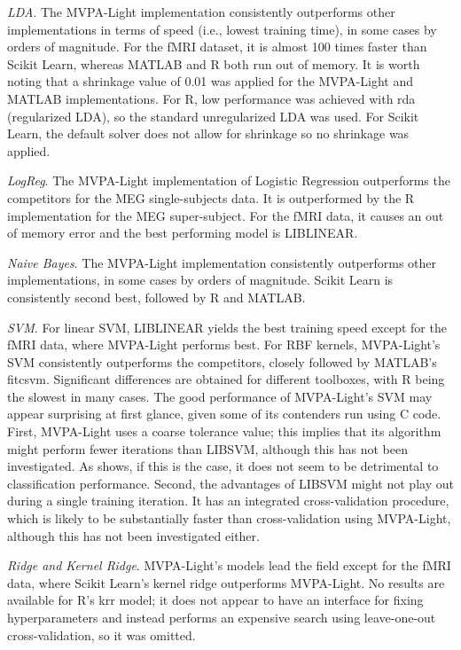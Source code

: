 \documentclass[utf8]{frontiersSCNS} %
\begin{document}
\textit{LDA}. The MVPA-Light implementation consistently outperforms other implementations in terms of speed (i.e., lowest training time), in some cases by orders of magnitude. For the fMRI dataset, it is almost 100 times faster than Scikit Learn, whereas MATLAB and R both run out of memory. It is worth noting that a shrinkage value of 0.01 was applied for the MVPA-Light and MATLAB implementations. For R, low performance was achieved with rda (regularized LDA), so the standard unregularized LDA was used. For Scikit Learn, the default solver does not allow for shrinkage so no shrinkage was applied.

\textit{LogReg}. The MVPA-Light implementation of Logistic Regression outperforms the competitors for the MEG single-subjects data. It is outperformed by the R implementation for the MEG super-subject. For the fMRI data, it causes an out of memory error and the best performing model is LIBLINEAR.

\textit{Naive Bayes}. The MVPA-Light implementation consistently outperforms other implementations, in some cases by orders of magnitude. Scikit Learn is consistently second best, followed by R and MATLAB.

\textit{SVM}. For linear SVM, LIBLINEAR yields the best training speed except for the fMRI data, where MVPA-Light performs best. For RBF kernels, MVPA-Light's SVM consistently outperforms the competitors, closely followed by MATLAB's fitcsvm. Significant differences are obtained for different toolboxes, with R being the slowest in many cases. The good performance of MVPA-Light's SVM may appear surprising at first glance, given some of its contenders run using C code. First, MVPA-Light uses a coarse tolerance value; this implies that its algorithm might perform fewer iterations than LIBSVM, although this has not been investigated. As  shows, if this is the case, it does not seem to be detrimental to classification performance. Second, the advantages of LIBSVM might not play out during a single training iteration. It has an integrated cross-validation procedure, which is likely to be substantially faster than cross-validation using MVPA-Light, although this has not been investigated either.

\textit{Ridge and Kernel Ridge}. MVPA-Light's models lead the field except for the fMRI data, where Scikit Learn's kernel ridge outperforms MVPA-Light. No results are available for R's krr model; it does not appear to have an interface for fixing hyperparameters and instead performs an expensive search using leave-one-out cross-validation, so it was omitted.
\end{document}
